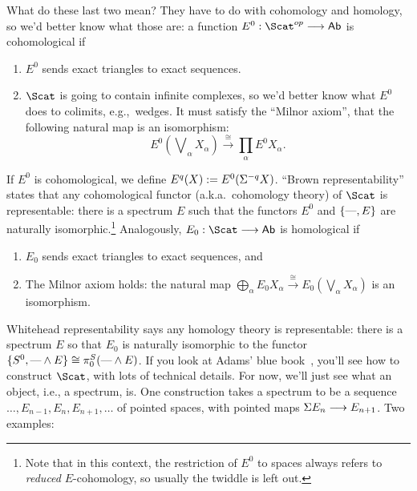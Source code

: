 What do these last two mean?  They have to do with cohomology and homology, so we'd better know what those are: a function $E^0: \Scat^{op} \to \Ab$ is cohomological if
\begin{enumerate}
\item $E^0$ sends exact triangles to exact sequences.
\item $\Scat$ is going to contain infinite complexes, so we'd better know what $E^0$ does to colimits, e.g.,\ wedges. It must satisfy the ``Milnor axiom'', that the following natural map is an isomorphism:
\[
E^0({\textstyle{\!\bigvee}_\alpha X_\alpha}) \xrightarrow{\cong} \prod_\alpha E^0 X_\alpha
.\]
\end{enumerate}
If $E^0$ is cohomological, we define $E^q (X) := E^0 (\Sigma^{-q} X)$. ``Brown representability'' states that any cohomological functor (a.k.a.\ cohomology theory) of $\Scat$ is representable: there is a spectrum $E$ such that the functors $E^0$ and $\{\textup{---}, E\}$ are naturally isomorphic.\footnote{Note that in this context, the restriction of $E^0$ to spaces always refers to \emph{reduced} $E$-cohomology, so usually the twiddle is left out.}  Analogously, $E_0: \Scat \to \Ab$ is homological if
\begin{enumerate}
\item $E_0$ sends exact triangles to exact sequences, and
\item The Milnor axiom holds: the natural map $\bigoplus_\alpha E_0 X_\alpha \xrightarrow{\cong} E_0(\bigvee_\alpha X_\alpha)$ is an isomorphism.
\end{enumerate}
Whitehead representability says any homology theory is representable: there is a spectrum $E$ so that $E_0$ is naturally isomorphic to the functor $\{S^0, \text{---} \wedge E\} \cong \pi^S_0(\text{---} \wedge E)$.  If you look at Adams' blue book~\cite{Adams}, you'll see how to construct $\Scat$, with lots of technical details.  For now, we'll just see what an object, i.e., a spectrum, is.  One construction takes a spectrum to be a sequence $\ldots, E_{n-1}, E_n, E_{n+1}, \ldots$ of pointed spaces, with pointed maps $\Sigma E_n \longrightarrow E_{n+1}$.  Two examples:
